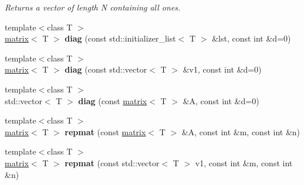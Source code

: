 \begin{DoxyCompactItemize}
\begin{DoxyCompactList}\small\item\em Returns a vector of length N containing all ones. \end{DoxyCompactList}\item 
\hypertarget{namespacekeycpp_a4bb3ea9a842383b82c889179f25be9ec}{{\footnotesize template$<$class T $>$ }\\\hyperlink{classkeycpp_1_1matrix}{matrix}$<$ T $>$ {\bfseries diag} (const std\-::initializer\-\_\-list$<$ T $>$ \&lst, const int \&d=0)}\label{namespacekeycpp_a4bb3ea9a842383b82c889179f25be9ec}

\item 
\hypertarget{namespacekeycpp_a400213b20d0dc5e0b31b1bf49f191f11}{{\footnotesize template$<$class T $>$ }\\\hyperlink{classkeycpp_1_1matrix}{matrix}$<$ T $>$ {\bfseries diag} (const std\-::vector$<$ T $>$ \&v1, const int \&d=0)}\label{namespacekeycpp_a400213b20d0dc5e0b31b1bf49f191f11}

\item 
\hypertarget{namespacekeycpp_ac8468ea36d1466ddeda8c64b9f46f8dd}{{\footnotesize template$<$class T $>$ }\\std\-::vector$<$ T $>$ {\bfseries diag} (const \hyperlink{classkeycpp_1_1matrix}{matrix}$<$ T $>$ \&A, const int \&d=0)}\label{namespacekeycpp_ac8468ea36d1466ddeda8c64b9f46f8dd}

\item 
\hypertarget{namespacekeycpp_ab56165975dd12a86b498134da71bde29}{{\footnotesize template$<$class T $>$ }\\\hyperlink{classkeycpp_1_1matrix}{matrix}$<$ T $>$ {\bfseries repmat} (const \hyperlink{classkeycpp_1_1matrix}{matrix}$<$ T $>$ \&A, const int \&m, const int \&n)}\label{namespacekeycpp_ab56165975dd12a86b498134da71bde29}

\item 
\hypertarget{namespacekeycpp_ab7a41247c257a0244dd45c849a0ec3d1}{{\footnotesize template$<$class T $>$ }\\\hyperlink{classkeycpp_1_1matrix}{matrix}$<$ T $>$ {\bfseries repmat} (const std\-::vector$<$ T $>$ v1, const int \&m, const int \&n)}\label{namespacekeycpp_ab7a41247c257a0244dd45c849a0ec3d1}


\end{DoxyCompactItemize}
